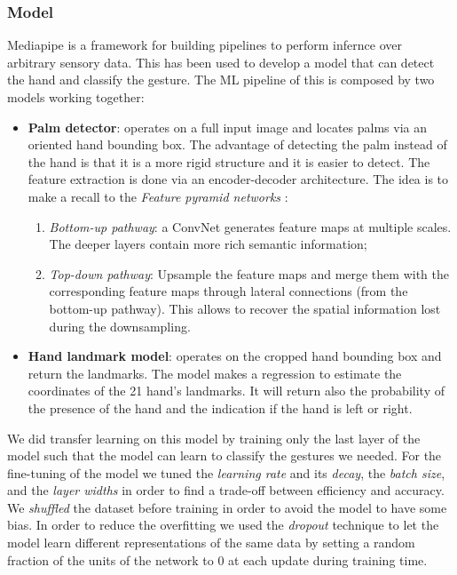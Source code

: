 \documentclass[10pt,twocolumn,letterpaper]{article}
\begin{document}
\subsubsection{Model}
Mediapipe is a framework for building pipelines to perform infernce over arbitrary sensory data. This has been used to develop a model that can detect the hand and classify the gesture.
The ML pipeline of this is composed by two models working together:
\begin{itemize}
   \item \textbf{Palm detector}: operates on a full input image and locates palms via an oriented hand bounding box. The advantage of detecting the palm instead of the hand 
   is that it is a more rigid structure and it is easier to detect. The feature extraction is done via an encoder-decoder architecture. The idea is to make a recall to the 
   \textit{Feature pyramid networks} \cite{lin2017featurepyramidnetworksobject}:
   \begin{enumerate}
      \item \textit{Bottom-up pathway}: a ConvNet generates feature maps at multiple scales. The deeper layers contain more rich semantic information;
      \item \textit{Top-down pathway}: Upsample the feature maps and merge them with the corresponding feature maps through lateral connections (from the bottom-up pathway).
      This allows to recover the spatial information lost during the downsampling.
   \end{enumerate}
   \item \textbf{Hand landmark model}: operates on the cropped hand bounding box and return the landmarks. 
   The model makes a regression to estimate the coordinates of the 21 hand's landmarks. It will return also the probability of the presence of the hand and 
   the indication if the hand is left or right.
\end{itemize}
We did transfer learning on this model by training only the last layer of the model such that the model can learn to classify the gestures we needed.
For the fine-tuning of the model we tuned the \textit{learning rate} and its \textit{decay}, 
the \textit{batch size}, and the \textit{layer widths} in order to find a trade-off between 
efficiency and accuracy.
We \textit{shuffled} the dataset before training in order to avoid the model to have some bias.
In order to reduce the overfitting we used the \textit{dropout} technique to 
let the model learn different representations of the same data by setting a random fraction of 
the units of the network to 0 at each update during training time.
\end{document}
